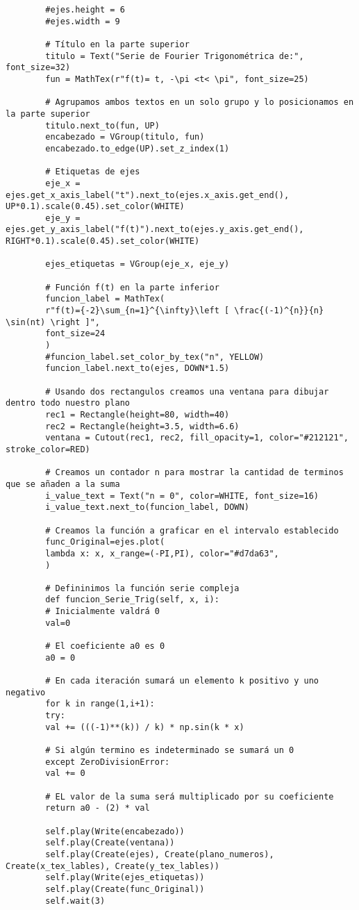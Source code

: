 \begin{longlisting}
\begin{verbatim}
		#ejes.height = 6
		#ejes.width = 9
		
		# Título en la parte superior
		titulo = Text("Serie de Fourier Trigonométrica de:", font_size=32)
		fun = MathTex(r"f(t)= t, -\pi <t< \pi", font_size=25)
		
		# Agrupamos ambos textos en un solo grupo y lo posicionamos en la parte superior
		titulo.next_to(fun, UP)
		encabezado = VGroup(titulo, fun)
		encabezado.to_edge(UP).set_z_index(1)
		
		# Etiquetas de ejes
		eje_x = ejes.get_x_axis_label("t").next_to(ejes.x_axis.get_end(), UP*0.1).scale(0.45).set_color(WHITE)
		eje_y = ejes.get_y_axis_label("f(t)").next_to(ejes.y_axis.get_end(), RIGHT*0.1).scale(0.45).set_color(WHITE)
		
		ejes_etiquetas = VGroup(eje_x, eje_y)
		
		# Función f(t) en la parte inferior
		funcion_label = MathTex(
		r"f(t)={-2}\sum_{n=1}^{\infty}\left [ \frac{(-1)^{n}}{n} \sin(nt) \right ]",
		font_size=24
		)
		#funcion_label.set_color_by_tex("n", YELLOW)
		funcion_label.next_to(ejes, DOWN*1.5)
		
		# Usando dos rectangulos creamos una ventana para dibujar dentro todo nuestro plano
		rec1 = Rectangle(height=80, width=40)
		rec2 = Rectangle(height=3.5, width=6.6)
		ventana = Cutout(rec1, rec2, fill_opacity=1, color="#212121", stroke_color=RED)
		
		# Creamos un contador n para mostrar la cantidad de terminos que se añaden a la suma
		i_value_text = Text("n = 0", color=WHITE, font_size=16)
		i_value_text.next_to(funcion_label, DOWN)
		
		# Creamos la función a graficar en el intervalo establecido
		func_Original=ejes.plot(
		lambda x: x, x_range=(-PI,PI), color="#d7da63",
		)
		
		# Defininimos la función serie compleja
		def funcion_Serie_Trig(self, x, i):
		# Inicialmente valdrá 0 
		val=0
		
		# El coeficiente a0 es 0
		a0 = 0
		
		# En cada iteración sumará un elemento k positivo y uno negativo
		for k in range(1,i+1):
		try:
		val += (((-1)**(k)) / k) * np.sin(k * x)
		
		# Si algún termino es indeterminado se sumará un 0
		except ZeroDivisionError:
		val += 0 
		
		# EL valor de la suma será multiplicado por su coeficiente    
		return a0 - (2) * val
		
		self.play(Write(encabezado))
		self.play(Create(ventana))
		self.play(Create(ejes), Create(plano_numeros), Create(x_tex_lables), Create(y_tex_lables))
		self.play(Write(ejes_etiquetas))
		self.play(Create(func_Original))
		self.wait(3)
		

\end{verbatim}
\end{longlisting}
